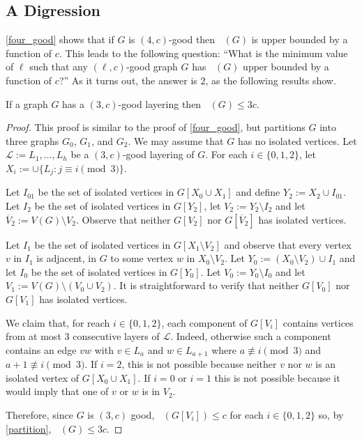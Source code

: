\documentclass{patmorin}
\DeclareMathOperator{\odd}{\chi_o}
\begin{document}
\subsection{A Digression}

\cref{four_good} shows that if $G$ is $(4,c)$-good then $\odd(G)$ is upper bounded by a function of $c$.  This leads to the following question:  ``What is the minimum value of $\ell$ such that any $(\ell,c)$-good graph $G$ has $\odd(G)$ upper bounded by a function of $c$?''  As it turns out, the answer is $2$, as the following results show.

\begin{lem}\label{three_good}
  If a graph $G$ has a $(3,c)$-good layering then $\odd(G)\le 3c$.
\end{lem}

\begin{proof}
  This proof is similar to the proof of \cref{four_good}, but partitions $G$ into three graphs $G_0$, $G_1$, and $G_2$.  We may assume that $G$ has no isolated vertices. Let $\mathcal{L}:=L_1,\ldots,L_h$ be a $(3,c)$-good layering of $G$. For each $i\in\{0,1,2\}$, let $X_i:=\cup\{L_j:j\equiv i\pmod 3\}$.

  Let $I_{01}$ be the set of isolated vertices in $G[X_0\cup X_1]$ and define $Y_2:=X_2\cup I_{01}$.  Let $I_2$ be the set of isolated vertices in $G[Y_2]$, let $V_2:=Y_2\setminus I_2$ and let $\overline{V}_2:=V(G)\setminus V_2$.  Observe that neither $G[V_2]$ nor $G[\overline{V}_2]$ has isolated vertices.

  Let $I_1$ be the set of isolated vertices in $G[X_1\setminus V_2]$ and observe that every vertex $v$ in $I_1$ is adjacent, in $G$ to some vertex $w$ in $X_0\setminus V_2$.  Let $Y_0:=(X_0\setminus V_2)\cup I_1$ and let $I_0$ be the set of isolated vertices in $G[Y_0]$.  Let $V_0:=Y_0\setminus I_0$ and let $V_1:=V(G)\setminus(V_0\cup V_2)$.  It is straightforward to verify that neither $G[V_0]$ nor $G[V_1]$ has isolated vertices.

  We claim that, for reach $i\in\{0,1,2\}$, each component of $G[V_i]$ contains vertices from at most $3$ consecutive layers of $\mathcal{L}$.  Indeed, otherwise such a component contains an edge $vw$ with $v\in L_a$ and $w\in L_{a+1}$ where $a\not\equiv i\pmod 3$ and $a+1\not\equiv i\pmod 3$.  If $i=2$, this is not possible because neither $v$ nor $w$ is an isolated vertex of $G[X_0\cup X_1]$.  If $i=0$ or $i = 1$ this is not possible because it would imply that one of $v$ or $w$ is in $V_2$.

  Therefore, since $G$ is $(3,c)$ good, $\odd(G[V_i])\le c$ for each $i\in\{0,1,2\}$ so, by \cref{partition}, $\odd(G)\le 3c$.
\end{proof}
\end{document}
